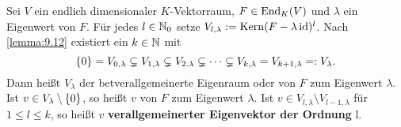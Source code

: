 \begin{definition}
	\label{def:9.13}
	Sei $V$ ein endlich dimensionaler $K$-Vektorraum, $F \in \operatorname{End}_K(V)$ und $\lambda$ ein Eigenwert von $F$.
	Für jedes $l \in \mathbb{N}_0$ setze $V_{l,\lambda} := \operatorname{Kern}(F-\lambda \operatorname{id})^l$.
	Nach \autoref{lemma:9.12} existiert ein $k \in \mathbb{N}$ mit
	\[
		\{0\} = V_{0,\lambda} \subsetneq V_{1,\lambda} \subsetneq V_{2.\lambda} \subsetneq \cdots \subsetneq V_{k,\lambda} = V_{k+1,\lambda} =: V_\lambda.
	\]
	Dann heißt $V_\lambda$ der bet{verallgemeinerte Eigenraum} oder  von $F$ zum Eigenwert $\lambda$. 
	Ist $v \in V_\lambda \setminus \{0\}$, so heißt $v$  von $F$ zum Eigenwert $\lambda$.
	Ist $v \in V_{l,\lambda} \setminus V_{l-1,\lambda}$ für $1 \leq l \leq k$, so heißt $v$ \textbf{verallgemeinerter Eigenvektor der Ordnung} l.
\end{definition}

